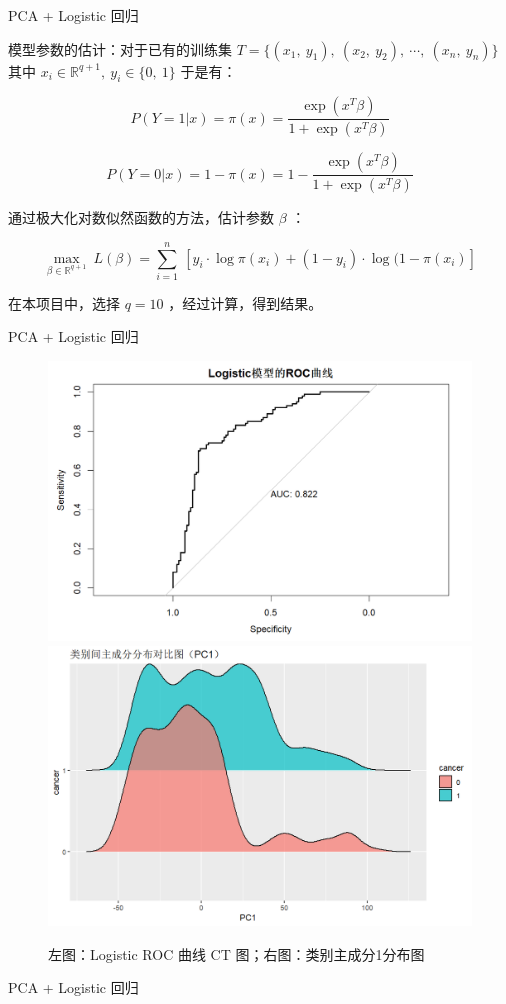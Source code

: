 \documentclass[11pt]{beamer}
\begin{document}
\begin{frame}{PCA + Logistic 回归}{}
\fontsize{9pt}{11pt}\selectfont

模型参数的估计：对于已有的训练集 $T = \{ (x_1,\ y_1),\ (x_2,\ y_2),\ \cdots,\ (x_n,\ y_n) \}$ 
其中 $x_i \in \mathbb{R}^{q+1},\ y_i \in \{ 0,\ 1 \}$ 于是有：

$$
P(Y=1|x) = \pi(x) = \frac{\exp(x^T\beta)}{1+\exp(x^T\beta)}
$$

$$
P(Y=0|x) = 1-\pi(x) = 1-\frac{\exp(x^T\beta)}{1+\exp(x^T\beta)}
$$

通过极大化对数似然函数的方法，估计参数 $\beta$ ：

$$
\max\limits_{\beta \in \mathbb{R}^{q+1}}\ L(\beta) = \sum\limits_{i=1}^n\ [ y_i\cdot \log \pi(x_i) + (1-y_i)\cdot \log (1- \pi(x_i) ]
$$

在本项目中，选择 $q = 10$ ，经过计算，得到结果。

\end{frame}


\begin{frame}{PCA + Logistic 回归}{}
\fontsize{9pt}{11pt}\selectfont
\begin{figure}
  \centering
  \includegraphics[width=0.45\linewidth]{imgs/roc.png}
  \hspace{0.05\linewidth}
  \includegraphics[width=0.45\linewidth]{imgs/pc1_compare.png}
  \caption{左图：Logistic ROC 曲线 CT 图；右图：类别主成分1分布图}
\end{figure}
\end{frame}

\begin{frame}{PCA + Logistic 回归}{}
\fontsize{9pt}{11pt}\selectfont



\end{frame}
\end{document}
